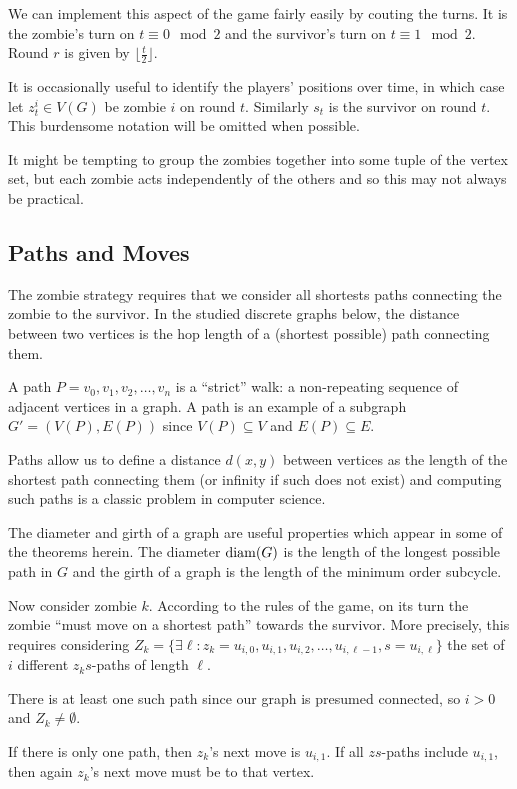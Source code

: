 We can implement this aspect of the game fairly easily by couting the turns.
It is the zombie's turn on $t \equiv 0 \mod{2}$ and the survivor's turn on $t \equiv 1 \mod{2}$.
Round $r$ is given by $\lfloor \frac{t}{2} \rfloor$.

It is occasionally useful to identify the players' positions over time, in which
case let $z_t^i \in V(G)$ be zombie $i$ on round $t$. Similarly $s_t$ is the
survivor on round $t$. This burdensome notation will be omitted when possible.

It might be tempting to group the zombies together
into some tuple of the vertex set, but each zombie acts independently of
the others and so this may not always be practical.

\subsection{Paths and Moves}
The zombie strategy requires that we consider all shortests paths connecting
the zombie to the survivor.
In the studied discrete graphs below, the distance between two vertices is the hop length of a (shortest possible) path connecting them.

A path $P = v_0, v_1, v_2, \dots , v_n$ is a ``strict'' walk: a non-repeating sequence of
adjacent vertices in a graph. A path is an example of a subgraph $G' = (V(P), E(P))$ since $V(P) \subseteq V$ and $E(P) \subseteq E$.

Paths allow us to define a distance $d(x,y)$ between vertices as the length of the shortest path connecting them (or infinity if such does not exist) and computing such paths is a classic
problem in computer science.

The diameter and girth of a graph are useful properties which appear in some
of the theorems herein.
The diameter $\operatorname{diam}(G)$ is the length of the longest possible path in $G$ and the girth of a graph is the length of the minimum order subcycle.

Now consider zombie $k$. According to the rules of the game, on its turn the zombie
``must move on a shortest path'' towards the survivor. More precisely, this requires
considering $Z_k = \{  \exists \ell : z_k = u_{i,0}, u_{i, 1}, u_{i, 2}, \dots, u_{i, \ell-1}, s= u_{i, \ell}\}$ the set of $i$ different $z_ks$-paths of length $\ell$.

There is at least one such path since our graph is presumed connected,
so $i > 0$ and $Z_k \neq \emptyset$.

If there is only one path, then $z_k$'s next move is $u_{i, 1}$. If all $zs$-paths
include $u_{i,1}$, then again $z_k$'s next move must be to that vertex.

